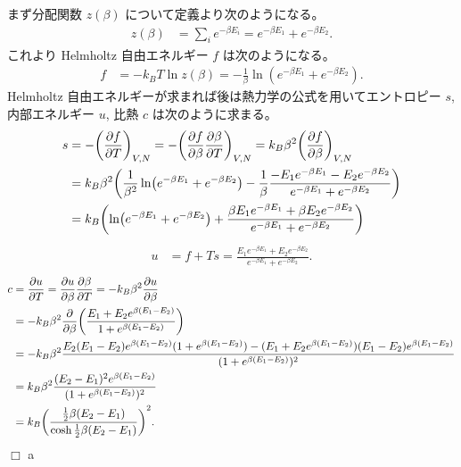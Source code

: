 \documentclass[uplatex,dvipdfmx,a4paper,11pt]{jlreq}
\theoremstyle{definition}
\begin{document}
まず分配関数 $z(\beta)$ について定義より次のようになる。
\begin{align}
  z(\beta) & = \sum_{i} e^{-\beta E_i} = e^{-\beta E_1} + e^{-\beta E_2}.
\end{align}
これより Helmholtz 自由エネルギー $f$ は次のようになる。
\begin{align}
  f & = -k_BT\ln z(\beta) = -\frac{1}{\beta}\ln(e^{-\beta E_1} + e^{-\beta E_2}).
\end{align}
Helmholtz 自由エネルギーが求まれば後は熱力学の公式を用いてエントロピー $s$, 内部エネルギー $u$, 比熱 $c$ は次のように求まる。
\begin{align}
  s & = - \qty(\pdv{f}{T})_{V,N} = - \qty(\pdv{f}{\beta}\pdv{\beta}{T})_{V,N} = k_B\beta^2\qty(\pdv{f}{\beta})_{V,N}                                                          \\
    & = k_B\beta^2\qty(\frac{1}{\beta^2}\ln(e^{-\beta E_1} + e^{-\beta E_2}) - \frac{1}{\beta}\frac{-E_1e^{-\beta E_1} - E_2e^{-\beta E_2}}{e^{-\beta E_1} + e^{-\beta E_2}}) \\
    & = k_B\qty(\ln(e^{-\beta E_1} + e^{-\beta E_2}) + \frac{\beta E_1e^{-\beta E_1} + \beta E_2e^{-\beta E_2}}{e^{-\beta E_1} + e^{-\beta E_2}})
\end{align}
\begin{align}
  u & = f + Ts = \frac{E_1e^{-\beta E_1} + E_2e^{-\beta E_2}}{e^{-\beta E_1} + e^{-\beta E_2}}.
\end{align}
\begin{align}
  c & = \pdv{u}{T} = \pdv{u}{\beta}\pdv{\beta}{T} = -k_B\beta^2\pdv{u}{\beta}                                                                                                         \\
    & = -k_B\beta^2\pdv{\beta}\qty(\frac{E_1 + E_2e^{\beta(E_1 - E_2)}}{1 + e^{\beta(E_1 - E_2)}})                                                                                    \\
    & = -k_B\beta^2\frac{E_2(E_1 - E_2)e^{\beta(E_1 - E_2)}(1 + e^{\beta(E_1 - E_2)}) - (E_1 + E_2e^{\beta(E_1 - E_2)})(E_1 - E_2)e^{\beta(E_1 - E_2)}}{(1 + e^{\beta(E_1 - E_2)})^2} \\
    & = k_B\beta^2\frac{(E_2 - E_1)^2e^{\beta(E_1 - E_2)}}{(1 + e^{\beta(E_1 - E_2)})^2}                                                                                              \\
    & = k_B\qty(\frac{\frac{1}{2}\beta(E_2 - E_1)}{\cosh\frac{1}{2}\beta(E_2 - E_1)})^2.
\end{align}
$\Box$
a
\end{document}
